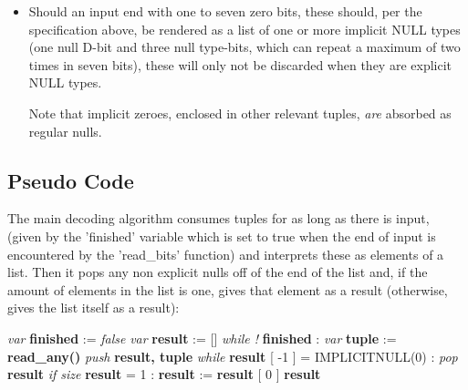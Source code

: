 \begin{itemize}
\item Should an input end with one to seven zero bits, these should, per the
  specification above, be rendered as a list of one or more implicit NULL types
  (one null D-bit and three null type-bits, which can repeat a maximum of
  two times in seven bits), these will only not be discarded when they
  are explicit NULL types.

  Note that implicit zeroes, enclosed in other relevant tuples, \textit{are}
  absorbed as regular nulls.
\end{itemize}

\subsection{Pseudo Code}

The main decoding algorithm consumes tuples for as long as there is input,
(given by the 'finished' variable which is set to true when the end of input
is encountered by the 'read\_bits' function)
and interprets these as elements of a list.
Then it pops any non explicit nulls off of the end of the list and, if the amount of
elements in the list is one, gives that element as a result
(otherwise, gives the list itself as a result):

\begin{changemargin}{-60mm}{0mm}
\begin{myquote}

\vbox{
\textit{var} \textbf{finished} := \textit{false} \newline
\textit{var} \textbf{result} := [] \newline
\textit{while !} \textbf{finished} : \newline
\indent\hspace{.5cm} \textit{var} \textbf{tuple} := \textbf{read\_any()} \newline
\indent\hspace{.5cm} \textit{push} \textbf{result, tuple} \newline
\textit{while} \textbf{result} [ -1 ] = IMPLICITNULL(0) :\newline
\indent\hspace{.5cm} \textit{pop} \textbf{result} \newline
\textit{if size} \textbf{result} = 1 : \newline
\indent\hspace{.5cm} \textbf{result} := \textbf{result} [ 0 ] \newline
\textbf{result} \newline
}

\end{myquote}
\end{changemargin}

